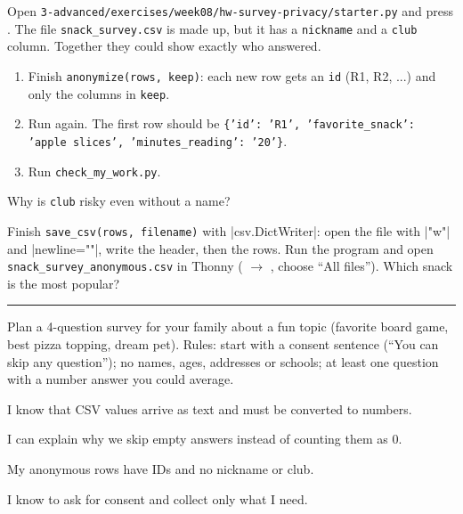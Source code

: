 \namedateline

\begin{core}
Open \texttt{3-advanced/exercises/week08/hw-survey-privacy/starter.py} and press . The file \texttt{snack\_survey.csv} is made up, but it has a \texttt{nickname} and a \texttt{club} column. Together they could show exactly who answered.
\begin{enumerate}[itemsep=1pt]
  \item Finish \texttt{anonymize(rows, keep)}: each new row gets an \texttt{id} (R1, R2, ...) and only the columns in \texttt{keep}.
  \item Run again. The first row should be \texttt{\{'id': 'R1', 'favorite\_snack': 'apple slices', 'minutes\_reading': '20'\}}.
  \item Run \texttt{check\_my\_work.py}.
\end{enumerate}
Why is \texttt{club} risky even without a name? 
\end{core}

\begin{challenge}
Finish \texttt{save\_csv(rows, filename)} with \py|csv.DictWriter|: open the file with \py|"w"| and \py|newline=""|, write the header, then the rows. Run the program and open \texttt{snack\_survey\_anonymous.csv} in Thonny ( $\rightarrow$ , choose \enquote{All files}). Which snack is the most popular? \rule{4cm}{0.4pt}
\end{challenge}

\begin{creative}
Plan a 4-question survey for your family about a fun topic (favorite board game, best pizza topping, dream pet). Rules: start with a consent sentence (\enquote{You can skip any question}); no names, ages, addresses or schools; at least one question with a number answer you could average.
\end{creative}

\begin{selfcheck}
  \item I know that CSV values arrive as text and must be converted to numbers.
  \item I can explain why we skip empty answers instead of counting them as 0.
  \item My anonymous rows have IDs and no nickname or club.
  \item I know to ask for consent and collect only what I need.
\end{selfcheck}
